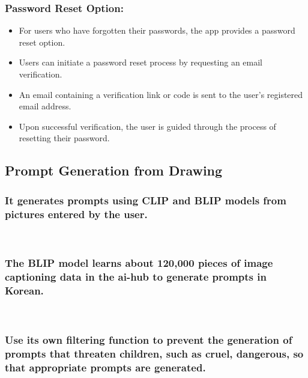\documentclass[conference]{IEEEtran}
\begin{document}
\subsubsection{Password Reset Option: }
\begin{itemize}
    \item For users who have forgotten their passwords, the app provides a password reset option.\\
    \item Users can initiate a password reset process by requesting an email verification. \\
    \item An email containing a verification link or code is sent to the user's registered email address. \\
    \item Upon successful verification, the user is guided through the process of resetting their password. \\
\end{itemize}


\subsection{Prompt Generation from Drawing }

\subsubsection{It generates prompts using CLIP and BLIP models from pictures entered by the user.}
\

\subsubsection{The BLIP model learns about 120,000 pieces of image captioning data in the ai-hub to generate prompts in Korean.}
\

\subsubsection{Use its own filtering function to prevent the generation of prompts that threaten children, such as cruel, dangerous, so that appropriate prompts are generated.}
\
\end{document}
